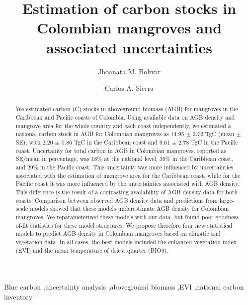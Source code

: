\documentclass[review, authoryear]{elsarticle}   	%
\begin{document}
\begin{frontmatter}

\title{Estimation of carbon stocks in Colombian mangroves and associated uncertainties}
\author[MPI,CYB]{Jhoanata M. Bolivar}
\author[MPI,CYB]{Carlos A. Sierra}
\address[MPI]{Max Planck Institute for Biogeochemistry, Hans-Kn\"oll-Str. 10, 07745 Jena, Germany}
\address[CYB]{Research Center on Ecosystems and Global Change Carbono \& Bosques, Medell\'in, Colombia}



\begin{abstract}
We estimated carbon (C) stocks in aboveground biomass (AGB) for mangroves in the Caribbean and Pacific coasts of Colombia. Using available data on AGB density and mangrove area for the whole country and each coast independently, we estimated a national carbon stock in AGB for Colombian mangroves as 14.95 $\pm$ 2.72 TgC (mean $\pm$ SE), with 2.20 $\pm$ 0.86 TgC in the Caribbean coast and 9.61 $\pm$ 2.78 TgC in the Pacific coast. Uncertainty for total carbon in AGB in Colombian mangroves, reported as SE/mean in percentage, was 18\% at the national level, 39\% in the Caribbean coast, and 29\% in the Pacific coast. This uncertainty was more influenced by uncertainties associated with the estimation of mangrove area for the Caribbean coast, while for the Pacific coast it was more influenced by the uncertainties associated with AGB density. This difference is the result of a contrasting availability of AGB density data for both coasts.  Comparison between observed AGB density data and predictions from large-scale models showed that these models underestimate AGB density for Colombian mangroves. We reparameterized these models with our data, but found poor goodness-of-fit statistics for these model structures. We propose therefore four new statistical models to predict AGB density in Colombian mangroves based on climatic and vegetation data. In all cases, the best models included the enhanced vegetation index (EVI) and the mean temperature of driest quarter (BIO9). 
\end{abstract}

\begin{keyword}
Blue carbon \sep uncertainty analysis \sep aboveground biomass \sep EVI \sep national carbon inventory
\end{keyword}

\end{frontmatter}

%
\end{document}

